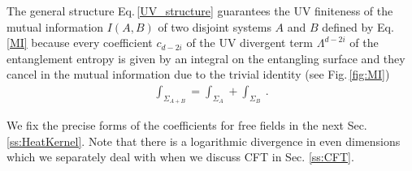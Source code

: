 The general structure Eq.\,\eqref{UV_structure} guarantees the UV finiteness of the mutual information $I(A,B)$ of two disjoint systems $A$ and $B$ defined by Eq.\,\eqref{MI} because every coefficient $c_{d-2i}$ of the UV divergent term $\Lambda^{d-2i}$ of the entanglement entropy is given by an integral on the entangling surface and they cancel in the mutual information due to the trivial identity (see Fig.\,\ref{fig:MI})
\begin{align}
	\int_{\Sigma_{A+B}} = \int_{\Sigma_A} + \int_{\Sigma_B} \ .
\end{align}


We fix the precise forms of the coefficients for free fields in the next Sec. \ref{ss:HeatKernel}.
Note that there is a logarithmic divergence in even dimensions which we separately deal with when we discuss CFT in Sec. \ref{ss:CFT}.

\endinput